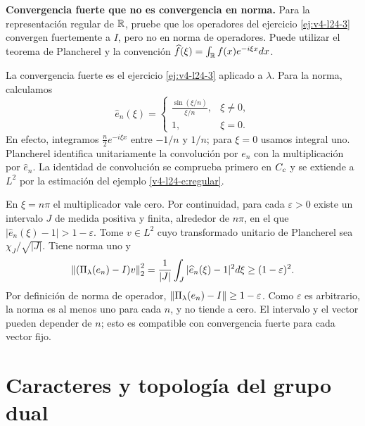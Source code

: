 \begin{ejercicio}\label{ej:v4-l24-8}
\textbf{Convergencia fuerte que no es convergencia en norma.}
Para la representación regular de $\mathbb R$, pruebe que los operadores del ejercicio \ref{ej:v4-l24-3} convergen fuertemente a $I$, pero no en norma de operadores. Puede utilizar el teorema de Plancherel y la convención $\widehat f(\xi)=\int_\mathbb R f(x)e^{-i\xi x}dx$.

\end{ejercicio}
\begin{solucion} La convergencia fuerte es el ejercicio \ref{ej:v4-l24-3} aplicado a $\lambda$. Para la norma, calculamos
\[
\widehat e_n(\xi)=\begin{cases}
\displaystyle\frac{\sin(\xi/n)}{\xi/n},&\xi\ne0,\\[4pt]
1,&\xi=0.
\end{cases}
\]
En efecto, integramos $\tfrac n2e^{-i\xi x}$ entre $-1/n$ y $1/n$; para $\xi=0$ usamos integral uno. Plancherel identifica unitariamente la convolución por $e_n$ con la multiplicación por $\widehat e_n$. La identidad de convolución se comprueba primero en $C_c$ y se extiende a $L^2$ por la estimación del ejemplo \ref{v4-l24-e:regular}.

En $\xi=n\pi$ el multiplicador vale cero. Por continuidad, para cada $\varepsilon>0$ existe un intervalo $J$ de medida positiva y finita, alrededor de $n\pi$, en el que $|\widehat e_n(\xi)-1|>1-\varepsilon$. Tome $v\in L^2$ cuyo transformado unitario de Plancherel sea $\chi_J/\sqrt{|J|}$. Tiene norma uno y
\[
\left\lVert(\Pi_\lambda(e_n)-I)v\right\rVert_2^2
=\frac1{|J|}\int_J|\widehat e_n(\xi)-1|^2d\xi
\geq(1-\varepsilon)^2.
\]
Por definición de norma de operador, $\left\lVert\Pi_\lambda(e_n)-I\right\rVert\geq1-\varepsilon$. Como $\varepsilon$ es arbitrario, la norma es al menos uno para cada $n$, y no tiende a cero. El intervalo y el vector pueden depender de $n$; esto es compatible con convergencia fuerte para cada vector fijo.\end{solucion}

\chapter{Caracteres y topología del grupo dual}

